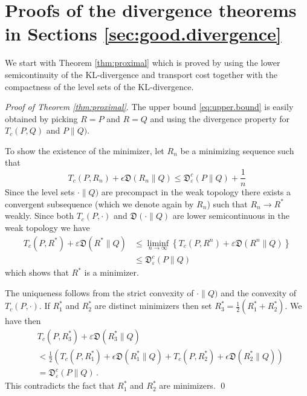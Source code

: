 \documentclass{amsart}
\theoremstyle{definition}
\theoremstyle{remark}
\numberwithin{equation}{section}
\begin{document}



\appendix 

\section{Proofs of the divergence theorems  in Sections \ref{sec:good.divergence}} 
\label{sec:proofs.good.divergence}


We start with Theorem \ref{thm:proximal} which is proved by 
using the lower semicontinuity of the KL-divergence and transport cost together with the compactness of the level sets of the KL-divergence.

\noindent
{\it Proof of Theorem \ref{thm:proximal}}.  The upper bound 
\eqref{eq:upper.bound} is easily obtained by picking $R=P$ and $R=Q$ and using the divergence property for $T_c(P,Q)$ and $\mathfrak{}P\|Q)$. 

To show the existence of the minimizer, let $R_n$ be a minimizing sequence such that 
\begin{equation}
T_c(P,R_n) + \epsilon \mathfrak{D}(R_n \|Q)
\le \mathfrak{D}^{c}_{\varepsilon}(P\|Q) + \frac{1}{n}
\end{equation}
Since the level sets $\mathfrak{}\cdot\|Q)$ are precompact in the weak topology there exists a convergent subsequence (which we denote again by $R_n$) such that $R_n \to R^*$ weakly. Since both $T_c(P,\cdot)$ and $\mathfrak{D}(\cdot \| Q)$  are lower semicontinuous in the weak topology we have 
\begin{equation}
\begin{aligned}
T_c(P,R^*) + \varepsilon \mathfrak{D}(R^* \|Q) &\le \liminf_{n \to \infty} \left\{T_c(P,R^n) + \varepsilon \mathfrak{D}(R^n \|Q) \right\}
\\
& \le \mathfrak{D}^{c}_{\varepsilon}(P\|Q) 
\end{aligned}
\end{equation}
which shows that $R^*$ is a minimizer.

The uniqueness follows from the strict convexity of $\mathfrak{}\cdot\|Q)$ and the convexity of  $T_c(P,\cdot)$. 
If $R_1^*$ and $R_2^*$ are distinct minimizers then set $R_3^*=\frac12(R_1^*+R_2^*)$.
We have then 
\begin{equation}
\begin{aligned}
&T_c(P,R_3^*) + \varepsilon \mathfrak{D}(R_3^* \|Q) \\
& <  
\frac{1}{2} \left( T_c(P,R_1^*) + \epsilon \mathfrak{D}(R_1^* \|Q) + T_c(P,R_2^*)  + \epsilon \mathfrak{D}(R_2^* \|Q) \right)\\
&= \mathfrak{D}^{c}_{\varepsilon}(P\|Q)\,.
\end{aligned}
\end{equation}
This contradicts the fact that 
$R_1^*$ and $R_2^*$ are minimizers. \qed
\end{document}
